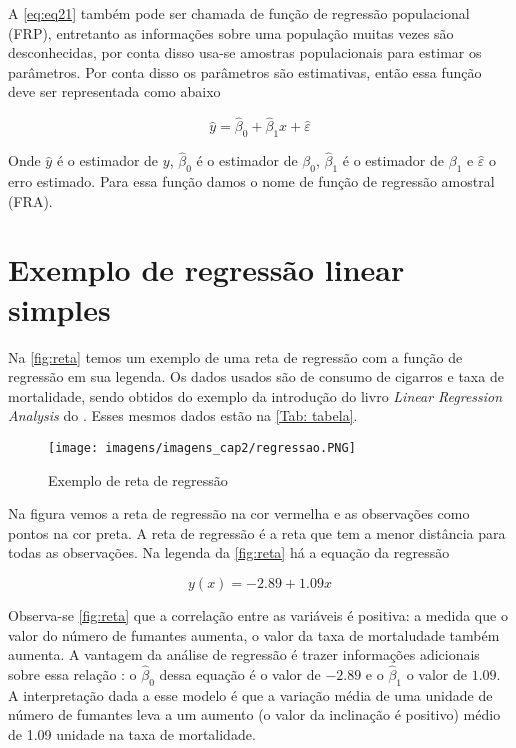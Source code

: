 \noindent A \autoref{eq:eq21} também pode ser chamada de função de regressão populacional (FRP), entretanto as informações sobre uma população muitas vezes são desconhecidas, por conta disso usa-se amostras populacionais para estimar os parâmetros. Por conta disso os parâmetros são estimativas, então essa função deve ser representada como abaixo

\begin{equation}\label{eq:eq22}
    \hat{y} = \hat{\beta}_0 + \hat{\beta}_1 x + \hat{\varepsilon}
\end{equation}

\noindent Onde $\hat{y}$ é o estimador de $y$, $\hat{\beta}_0$ é o estimador de $\beta_0$, $\hat{\beta}_1$ é o estimador de $\beta_1$ e $\hat{\varepsilon}$ o erro estimado. Para essa função damos o nome de função de regressão amostral (FRA).

\section{Exemplo de regressão linear simples}

\noindent Na \autoref{fig:reta} temos um exemplo de uma reta de regressão com a função de regressão em sua legenda. Os dados usados são de consumo de cigarros e taxa de mortalidade, sendo obtidos do exemplo da introdução do livro \textit{Linear Regression Analysis} do . Esses mesmos dados estão na \autoref{Tab: tabela}.

\begin{figure}[H]
\centering
\caption{Exemplo de reta de regressão}
\texttt{[image: imagens/imagens\_cap2/regressao.PNG]}
\label{fig:reta}
\end{figure}

\noindent Na figura vemos a reta de regressão na cor vermelha e as observações como pontos na cor preta. A reta de regressão é a reta que tem a menor distância para todas as observações. Na legenda da \autoref{fig:reta} há a equação da regressão

\begin{equation}\label{eq:eq22}
    y(x) = -2.89 + 1.09x
\end{equation}

\noindent Observa-se \autoref{fig:reta} que a correlação entre as variáveis é positiva: a medida que o valor do número de fumantes aumenta, o valor da taxa de mortaludade também aumenta. A vantagem da análise de regressão é trazer informações adicionais sobre essa relação : o $\hat{\beta}_0$ dessa equação é o valor de $-2.89$ e o $\hat{\beta}_1$ o valor de $1.09$. A interpretação dada a esse modelo é que a variação média de uma unidade de número de fumantes leva a um aumento (o valor da inclinação é positivo) médio de 1.09 unidade na taxa de mortalidade. \\

